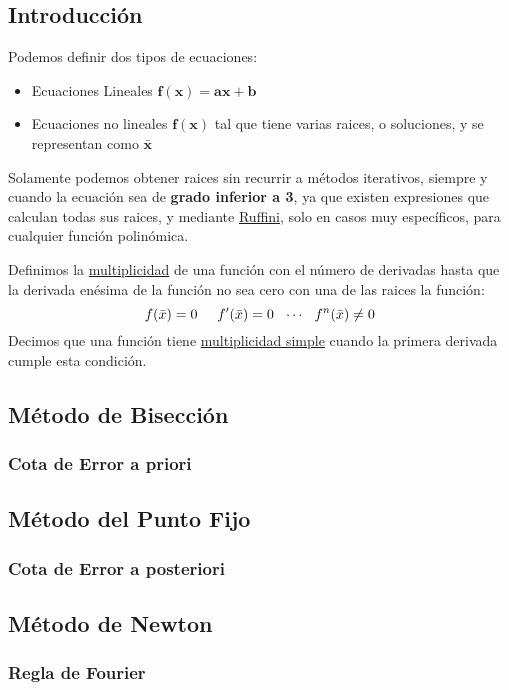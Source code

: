 \subsection{Introducción}
\noindent Podemos definir dos tipos de ecuaciones:
\begin{itemize}
        \item Ecuaciones Lineales \(\mathbf{f(x) = ax +b}\)
        \item Ecuaciones no lineales \(\mathbf{f(x)}\) tal que tiene varias raices, o soluciones, y se representan como \(\mathbf{\bar{x}}\)
\end{itemize}
\noindent Solamente podemos obtener raices sin recurrir a métodos iterativos, siempre y cuando la ecuación sea de \textbf{grado inferior a 3}, ya que existen expresiones que calculan todas sus raices, y mediante \underline{Ruffini}, solo en casos muy específicos, para cualquier función polinómica.
\par
\vspace{.5cm}
\noindent Definimos la \underline{multiplicidad} de una función con el número de derivadas hasta que la derivada enésima de la función no sea cero con una de las raices la función:
\[
        f(\bar{x}) = 0 \hspace{5mm}f'(\bar{x}) = 0 \hspace{2.5mm} \cdots \hspace{2.5mm} f^n(\bar{x}) \not = 0
\]
Decimos que una función tiene \underline{multiplicidad simple} cuando la primera derivada cumple esta condición.
\subsection{Método de Bisección}
\subsubsection{Cota de Error a priori}
\subsection{Método del Punto Fijo}
\subsubsection{Cota de Error a posteriori}
\subsection{Método de Newton}
\subsubsection{Regla de Fourier}